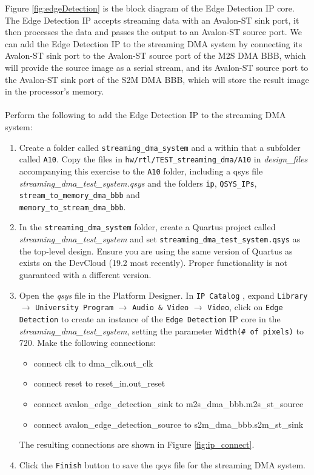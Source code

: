 \documentclass[epsfig,10pt,fullpage]{article}
\begin{document}
\noindent
Figure \ref{fig:edgeDetection} is the block diagram of the Edge Detection IP core. The Edge Detection IP accepts streaming data with an Avalon-ST sink port, it then processes the data and passes the output to an Avalon-ST source port. We can add the Edge Detection IP to the streaming DMA system by connecting its Avalon-ST sink port to the Avalon-ST source port of the M2S DMA BBB, which will provide the source image as a serial stream, and its Avalon-ST source port to the Avalon-ST sink port of the S2M DMA BBB, which will store the result image in the processor's memory.\\
\\
Perform the following to add the Edge Detection IP to the streaming DMA system:
\begin{enumerate}
    \item Create a folder called \texttt{streaming\_dma\_system} and a within that a subfolder called \texttt{A10}. Copy the files in \texttt{hw/rtl/TEST\_streaming\_dma/A10} in {\it design\_files} accompanying this exercise to the \texttt{A10} folder, including a qsys file {\it streaming\_dma\_test\_system.qsys} and the folders \texttt{ip}, \texttt{QSYS\_IPs}, \texttt{stream\_to\_memory\_dma\_bbb} and \\ \texttt{memory\_to\_stream\_dma\_bbb}. 
    
    \item In the \texttt{streaming\_dma\_system} folder, create a Quartus project called \emph{streaming\_dma\_test\_system} and set \texttt{streaming\_dma\_test\_system.qsys} as the top-level design. Ensure you are using the same version of Quartus as exists on the DevCloud (19.2 most recently). Proper functionality is not guaranteed with a different version. 
    
    \item Open the {\it qsys} file in the Platform Designer. In \texttt{IP Catalog} , expand \texttt{Library} $\rightarrow$ \texttt{University Program} $\rightarrow$ \texttt{Audio \& Video} $\rightarrow$ \texttt{Video}, click on \texttt{Edge Detection} to create an instance of the \texttt{Edge Detection} IP core in the \emph{streaming\_dma\_test\_system}, setting the parameter \texttt{Width(\# of pixels)} to 720. Make the following connections:
        \begin{itemize}
            \item connect clk to dma\_clk.out\_clk
            \item connect reset to reset\_in.out\_reset
            \item connect avalon\_edge\_detection\_sink to m2s\_dma\_bbb.m2s\_st\_source
            \item connect avalon\_edge\_detection\_source to s2m\_dma\_bbb.s2m\_st\_sink
        \end{itemize}
        The resulting connections are shown in Figure \ref{fig:ip_connect}.
    
    \item Click the \texttt{Finish} button to save the qsys file for the streaming DMA system.
\end{enumerate}
\end{document}
